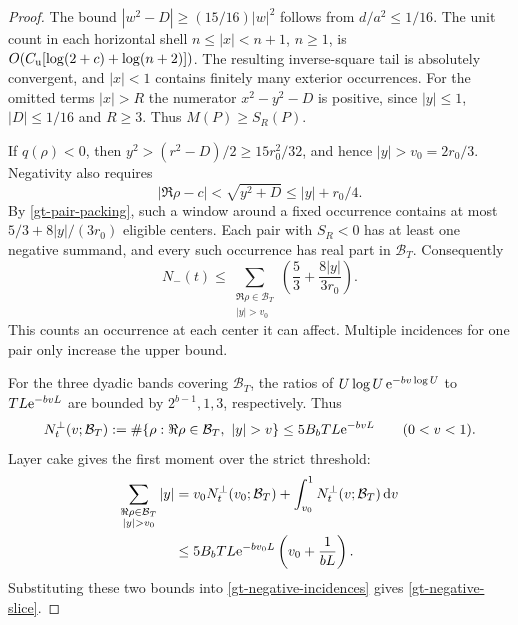 \begin{proof}
The bound \(|w^2-D|\ge(15/16)|w|^2\) follows from
\(d/a^2\le1/16\). The unit count in each horizontal shell
\(n\le|x|<n+1\), \(n\ge1\), is
\(O(C_{\rm u}[\log(2+c)+\log(n+2)])\).
The resulting inverse-square tail is absolutely convergent,
and \(|x|<1\) contains finitely many exterior occurrences.
For the omitted terms \(|x|>R\) the numerator
\(x^2-y^2-D\) is positive, since \(|y|\le1\), \(|D|\le1/16\)
and \(R\ge3\). Thus \(M(P)\ge S_R(P)\).

If \(q(\rho)<0\), then \(y^2>(r^2-D)/2\ge15r_0^2/32\), and
hence \(|y|>v_0=2r_0/3\). Negativity also requires
\[
 |\Re\rho-c|<\sqrt{y^2+D}\le |y|+r_0/4 .
\]
By \eqref{gt-pair-packing}, such a window around a fixed occurrence
contains at most \(5/3+8|y|/(3r_0)\) eligible centers.
Each pair with \(S_R<0\) has at least one negative summand, and
every such occurrence has real part in \(\mathcal B_T\). Consequently
\begin{equation}
 N_-(t)\le
 \sum_{\substack{\Re\rho\in\mathcal B_T\\ |y|>v_0}}
        \left(\frac53+\frac{8|y|}{3r_0}\right).
 \label{gt-negative-incidences}
\end{equation}
This counts an occurrence at each center it can affect. Multiple
incidences for one pair only increase the upper bound.

For the three dyadic bands covering \(\mathcal B_T\), the ratios of
\(U\log U\,\mathrm e^{-bv\log U}\) to \(TL\mathrm e^{-bvL}\) are bounded by
\(2^{b-1},1,3\), respectively. Thus
\[
 N_t^\perp(v;\mathcal B_T):=\#\{\rho:\Re\rho\in\mathcal B_T,\ |y|>v\}
 \le5B_b TL\e^{-bvL}\qquad(0<v<1).
\]
Layer cake gives the first moment over the strict threshold:
\[
 \begin{split}
 \sum_{\substack{\Re\rho\in\mathcal B_T\\ |y|>v_0}}|y|
 &=v_0N_t^\perp(v_0;\mathcal B_T)+\int_{v_0}^1N_t^\perp(v;\mathcal B_T)\,\dd v\\
 &\le5B_b TL\e^{-bv_0L}\left(v_0+\frac1{bL}\right).
 \end{split}
\]
Substituting these two bounds into \eqref{gt-negative-incidences}
gives \eqref{gt-negative-slice}.
\end{proof}

